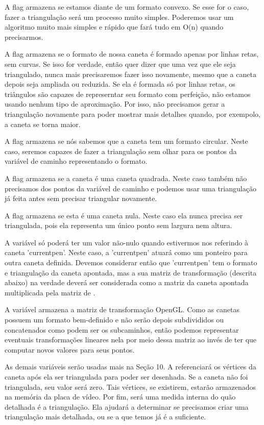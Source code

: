 A flag  armazena se estamos diante de um
formato convexo. Se esse for o caso, fazer a triangulação será um
processo muito simples. Poderemos usar um algoritmo muito mais simples
e rápido que fará tudo em O(n) quando precisarmos.

A flag  armazena se o formato de nossa caneta
é formado apenas por linhas retas, sem curvas. Se isso for verdade,
então quer dizer que uma vez que ele seja triangulado, nunca mais
precisaremos fazer isso novamente, mesmo que a caneta depois seja
ampliada ou reduzida. Se ela é formada só por linhas retas, os
triângulos são capazes de represerntar seu formato com perfeição, não
estamos usando nenhum tipo de aproximação. Por isso, não precisamos
gerar a triangulação novamente para poder mostrar mais detalhes
quando, por exempolo, a caneta se torna maior.

A flag  armazena se nós sabemos que a caneta
tem um formato circular. Neste caso, seremos capazes de fazer a
triangulação sem olhar para os pontos da variável de caminho
representando o formato.

A flag  armazena se a caneta é uma caneta
quadrada. Neste caso também não precisamos dos pontos da variável de
caminho e podemos usar uma triangulação já feita antes sem precisar
triangular novamente.

A flag  armazena se esta é uma caneta
nula. Neste caso ela nunca precisa ser triangulada, pois ela
representa um único ponto sem largura nem altura.

A variável  só poderá ter um valor não-nulo
quando estivermos nos referindo à caneta 'currentpen'. Neste caso, a
'currentpen' atuará como um ponteiro para outra caneta
definida. Devemos considerar então que 'currentpen' tem o formato e
triangulação da caneta apontada, mas a sua matriz de transformação
(descrita abaixo) na verdade deverá ser considerada como a matriz da
caneta apontada multiplicada pela matriz de .

A variável  armazena a matriz de transformação
OpenGL. Como as canetas possuem um formato bem-definido e não serão
depois subdivididos ou concatenados como podem ser os subcaminhos,
então podemos representar eventuais transformações lineares nela por
meio dessa matriz ao invés de ter que computar novos valores para seus
pontos.

As demais variáveis serão usadas mais na Seção
10. A  referenciará os vértices da caneta após ela
ser triangulada para poder ser desenhada. Se a caneta não foi
triangulada, seu valor será zero. Tais vértices, se existirem, estarão
armazenados na memória da placa de vídeo. Por
fim,  será uma medida interna do quão
detalhada é a triangulação. Ela ajudará a determinar se precisamos
criar uma triangulação mais detalhada, ou se a que temos já é a
suficiente.

